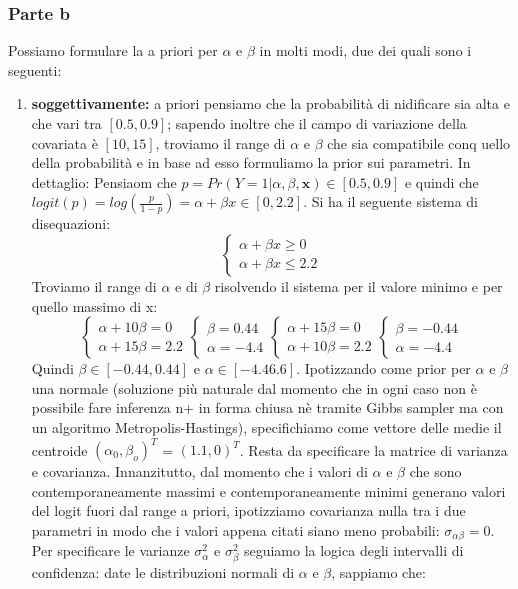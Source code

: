 \subsubsection*{Parte b} %
Possiamo formulare la a priori per $\alpha$ e $\beta$ in molti modi, due dei quali sono i seguenti:
\begin{enumerate}
  \item \textbf{soggettivamente:} a priori pensiamo che la probabilità di nidificare sia alta e che vari tra $[0.5, 0.9]$; sapendo inoltre che il campo di variazione della covariata è $[10, 15]$, troviamo il range di $\alpha$ e $\beta$ che sia compatibile conq uello della probabilità e in base ad esso formuliamo la prior sui parametri. In dettaglio: Pensiaom che $p=Pr(Y=1 | \alpha, \beta, \mathbf{x}) \in [0.5, 0.9]$ e quindi che $logit(p) = log\left(\frac{p}{1-p}\right) = \alpha + \beta x \in [0, 2.2]$. Si ha il seguente sistema di disequazioni:
  $$\begin{cases} \alpha+\beta x \geq 0 \\ \alpha + \beta x \leq 2.2 \end{cases}$$
  Troviamo il range di $\alpha$ e di $\beta$ risolvendo il sistema per il valore minimo e per quello massimo di x:
   $$\begin{cases} \alpha+10\beta = 0 \\ \alpha +  15\beta = 2.2 \end{cases} \begin{cases}\beta = 0.44 \\ \alpha = -4.4\end{cases} \begin{cases} \alpha+15\beta = 0 \\ \alpha +  10\beta = 2.2 \end{cases} \begin{cases}\beta = -0.44 \\ \alpha = -4.4\end{cases}$$
   Quindi $\beta \in [-0.44, 0.44]$ e $\alpha \in [-4.4 6.6]$.
   Ipotizzando come prior per $\alpha$ e $\beta$ una normale (soluzione più naturale dal momento che in ogni caso non è possibile fare inferenza n+ in forma chiusa nè tramite Gibbs sampler ma con un algoritmo Metropolis-Hastings), specifichiamo come vettore delle medie il centroide $(\alpha_0, \beta_o)^T$ = $(1.1, 0)^T$.
   Resta da specificare la matrice di varianza e covarianza. Innanzitutto, dal momento che i valori di $\alpha$ e $\beta$ che sono contemporaneamente massimi e contemporaneamente minimi generano valori del logit fuori dal range a priori, ipotizziamo covarianza nulla tra i due parametri in modo che i valori appena citati siano meno probabili: $\sigma_{\alpha\beta} = 0$. Per specificare le varianze $\sigma_{\alpha}^2$ e $\sigma_{\beta}^2$ seguiamo la logica degli intervalli di confidenza: date le distribuzioni normali di $\alpha$ e $\beta$, sappiamo che:

\end{enumerate}
